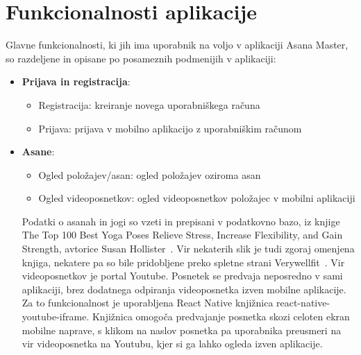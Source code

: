 \documentclass[a4paper, 12pt]{book}
\begin{document}
\section{Funkcionalnosti aplikacije}
Glavne funkcionalnosti, ki jih ima uporabnik na voljo v aplikaciji Asana Master, so razdeljene in opisane po posameznih podmenijih v aplikaciji:

 \begin{itemize}
 \item \textbf{Prijava in registracija}:
 \begin{itemize}
   \item Registracija: kreiranje novega uporabniškega računa
  \item Prijava: prijava v mobilno aplikacijo z uporabniškim računom
 \end{itemize}

 \item \textbf{Asane}:
  \begin{itemize}
  \item Ogled položajev/asan: ogled položajev oziroma asan
  \item Ogled videoposnetkov: ogled videoposnetkov položajec v mobilni aplikaciji  
   \end{itemize}
    Podatki o asanah in jogi so vzeti in prepisani v podatkovno bazo, iz knjige The Top 100 Best Yoga Poses Relieve Stress, Increase Flexibility, and Gain Strength, avtorice Susan Hollister~\cite{yoga}. Vir nekaterih slik je tudi zgoraj omenjena knjiga, nekatere pa so bile pridobljene preko spletne strani Verywellfit~\cite{verywellfit}. Vir videoposnetkov je portal Youtube. Posnetek se predvaja neposredno v sami aplikaciji, brez dodatnega odpiranja videoposnetka izven mobilne aplikacije. Za to funkcionalnost je uporabljena React Native knjižnica react-native-youtube-iframe. Knjižnica omogoča predvajanje posnetka skozi celoten ekran mobilne naprave, s klikom na naslov posnetka pa uporabnika preusmeri na vir videoposnetka na Youtubu, kjer si ga lahko ogleda izven aplikacije.
   

\end{itemize}
\end{document}

